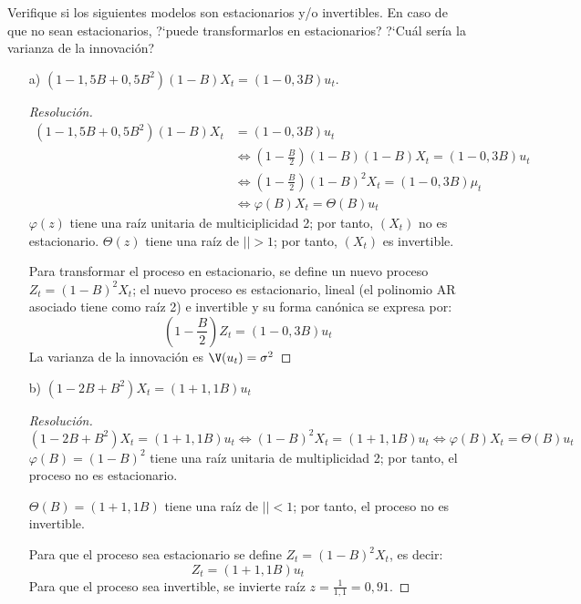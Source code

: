 \begin{ejemplo}
Verifique si los siguientes modelos son estacionarios y/o invertibles. En caso de que no sean estacionarios, ?`puede transformarlos en estacionarios? ?`Cu\'{a}l ser\'{i}a la varianza de la innovaci\'{o}n?

\begin{enumerate}
\item[a)] $(1-1,5 B +0,5 B^{2} ) (1 - B) X_{t}= (1-0,3B) u_{t}$.
\begin{proof}[Resoluci\'{o}n]
\begin{align*}
(1-1,5 B +0,5 B^{2}) (1 - B) X_{t}&=(1-0,3B) u_{{t }}\\
&\Longleftrightarrow
	\left(1-\frac{B}{2}\right)(1-B)(1-B)X_{t} = (1-0,3B)u_{t} \\
&\Longleftrightarrow
	\left(1-\frac{B}{2}\right)(1-B)^{2}X_{t}=(1-0,3B)\mu_{t}\\
&\Longleftrightarrow
	\varphi (B)X_{t} = \Theta (B)u_{t} 
\end{align*}
$\varphi (z)$ tiene una ra\'{i}z unitaria de multiciplicidad 2; por tanto, $(X_{t} )$ no es estacionario. $\Theta (z)$ tiene una ra\'{i}z de $\left| \right|>1$; por tanto, $(X_{t} )$ es invertible.\newline

Para transformar el proceso en estacionario, se define un nuevo proceso $Z_{t} =(1-B)^{2}X_{t} $; el nuevo proceso es estacionario, lineal (el polinomio AR asociado tiene como ra\'{i}z 2) e invertible y su forma can\'{o}nica se expresa por:
\[
\left(1-\frac{B}{2}\right)Z_{t} =(1-0,3B)u_{t} 
\]
La varianza de la innovaci\'{o}n es $\V(u_{t} )=\sigma^{2}$
\end{proof}

\item[b)] $(1-2 B + B^{2})X_{t}=(1+1,1B) u_{t}$
\begin{proof}[Resoluci\'{o}n]
\[
 (1-2B +B^{2})X_{t}=(1+1,1B) u_{t}\Leftrightarrow (1-B)^{2}X_{t} =(1+1,1B)u_{t} \Leftrightarrow \varphi (B)X_{t} =\Theta (B)u_{t}
\]
$\varphi (B)=
(1-B)^{2}$ tiene una ra\'{i}z unitaria de multiplicidad 2; por tanto, el proceso no es estacionario.\newline

$\Theta (B)=(1+1,1B)$ tiene una ra\'{i}z de $\left| \right|<1$; por tanto, el proceso no es invertible.\newline

Para que el proceso sea estacionario se define $Z_{t} =(1-B)^{2}X_{t} $, es decir:
\[
Z_{t} =(1+1,1B)u_{t} 
\]
Para que el proceso sea invertible, se invierte ra\'{i}z $z=\frac{1}{1,1}=0,91$.\newline


\end{proof}
\end{enumerate}
\end{ejemplo}
